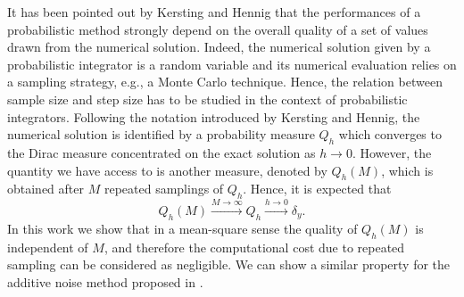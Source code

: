 \documentclass{siamart1116}
\numberwithin{theorem}{section}
\newcommand{\rightarrowtext}[1]{\ensuremath{\stackrel{#1}{\longrightarrow}}}
\begin{document}
It has been pointed out by Kersting and Hennig \cite{KeH16} that the performances of a probabilistic method strongly depend on the overall quality of a set of values drawn from the numerical solution. Indeed, the numerical solution given by a probabilistic integrator is a random variable and its numerical evaluation relies on a sampling strategy, e.g., a Monte Carlo technique. Hence, the relation between sample size and step size has to be studied in the context of probabilistic integrators. Following the notation introduced by Kersting and Hennig, the numerical solution is identified by a probability measure $Q_h$ which converges to the Dirac measure concentrated on the exact solution as $h\to 0$. However, the quantity we have access to is another measure, denoted by $Q_h(M)$, which is obtained after $M$ repeated samplings of $Q_h$. Hence, it is expected that
\begin{equation}
Q_h(M) \rightarrowtext{M\to\infty} Q_h \rightarrowtext{h\to 0} \delta_y.
\end{equation}
In this work we show that in a mean-square sense the quality of $Q_h(M)$ is independent of $M$, and therefore the computational cost due to repeated sampling can be considered as negligible. We can show a similar property for the additive noise method proposed in \cite{CGS16}.
\end{document}
